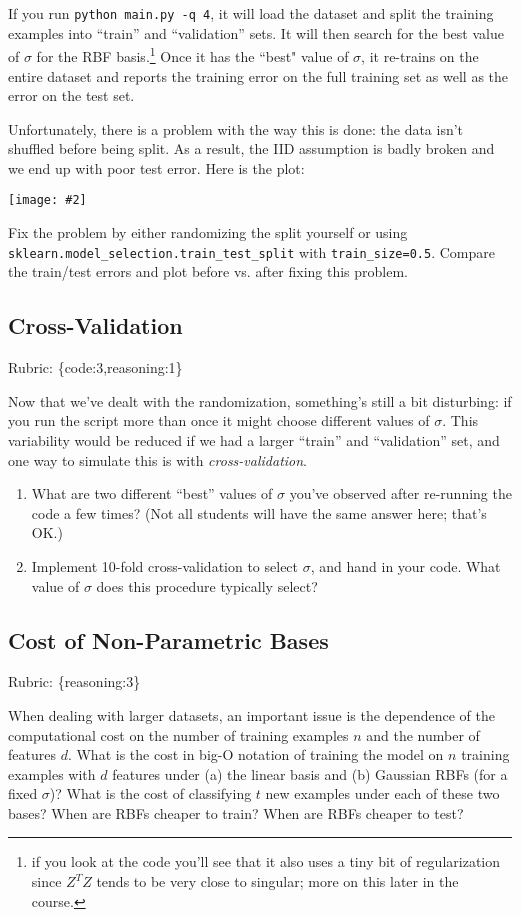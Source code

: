 \documentclass{article}
\def\rubric#1{\gre{Rubric: \{#1\}}}{}
\def\blu#1{{\color{blu}#1}}
\def\gre#1{{\color{gre}#1}}
\newcommand{\centerfig}[2]{\begin{center}\texttt{[image: \#2]}\end{center}}
\def\enum#1{\begin{enumerate}#1\end{enumerate}}
\begin{document}
If you run \verb|python main.py -q 4|, it will load the dataset and split the training examples
 into ``train'' and ``validation'' sets. It will then search for the best value of $\sigma$
 for the RBF basis.\footnote{if you look at the code you'll see that it also uses a tiny bit of regularization since $Z^TZ$ tends to be very close to singular; more on this later in the course.}
  Once it has the ``best" value of $\sigma$, it re-trains on the entire dataset and reports the
  training error on the full training set as well as the error on the test set.

Unfortunately, there is a problem with the way this is done: the data isn't shuffled before being split.
As a result, the IID assumption is badly broken and we end up with poor test error. Here is the plot:

\centerfig{.7}{../figs/least_squares_rbf_bad.pdf}


\blu{Fix the problem by either randomizing the split yourself or using \texttt{sklearn.model\_selection.train\_test\_split} with \texttt{train\_size=0.5}. Compare the train/test errors and plot before vs. after fixing this problem.}


\subsection{Cross-Validation}
\rubric{code:3,reasoning:1}

Now that we've dealt with the randomization, something's still a bit disturbing:
if you run the script more than once it might choose different values of $\sigma$.
This variability would be reduced if we
had a larger ``train'' and ``validation'' set, and one way to simulate this is
with \emph{cross-validation}. 

\blu{\enum{
\item What are two different ``best'' values of $\sigma$ you've observed after re-running the code a few times? (Not all students will have the same answer here; that's OK.)
\item Implement 10-fold cross-validation to select $\sigma$, and hand in your code. What value of $\sigma$ does this procedure typically select?
}}


\subsection{Cost of Non-Parametric Bases}
\rubric{reasoning:3}

When dealing with larger datasets, an important issue is the dependence of the
computational cost on the number of training examples $n$ and the number of
features $d$. \blu{What is the cost in big-O notation of training the model
on $n$ training examples with $d$ features under (a) the linear basis and
(b) Gaussian RBFs (for a fixed $\sigma$)? What is the cost of
classifying $t$ new examples under each of these two bases? When are RBFs
cheaper to train? When are RBFs cheaper to test?}
\end{document}
